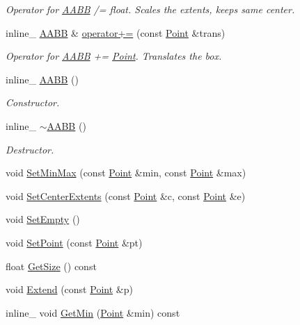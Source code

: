 \begin{DoxyCompactItemize}
\begin{DoxyCompactList}\small\item\em Operator for \hyperlink{class_a_a_b_b}{A\+A\+B\+B} /= float. Scales the extents, keeps same center. \end{DoxyCompactList}\item 
\hypertarget{class_a_a_b_b_a1aa2bcb5279bd03fc4b9e074e1249fec}{inline\+\_\+ \hyperlink{class_a_a_b_b}{A\+A\+B\+B} \& \hyperlink{class_a_a_b_b_a1aa2bcb5279bd03fc4b9e074e1249fec}{operator+=} (const \hyperlink{class_point}{Point} \&trans)}\label{class_a_a_b_b_a1aa2bcb5279bd03fc4b9e074e1249fec}

\begin{DoxyCompactList}\small\item\em Operator for \hyperlink{class_a_a_b_b}{A\+A\+B\+B} += \hyperlink{class_point}{Point}. Translates the box. \end{DoxyCompactList}\item 
\hypertarget{class_a_a_b_b_ad318cad1a1e40ecb7560f953d439527c}{inline\+\_\+ \hyperlink{class_a_a_b_b_ad318cad1a1e40ecb7560f953d439527c}{A\+A\+B\+B} ()}\label{class_a_a_b_b_ad318cad1a1e40ecb7560f953d439527c}

\begin{DoxyCompactList}\small\item\em Constructor. \end{DoxyCompactList}\item 
\hypertarget{class_a_a_b_b_a013e16f21145d12bd19b384b31055fb2}{inline\+\_\+ \hyperlink{class_a_a_b_b_a013e16f21145d12bd19b384b31055fb2}{$\sim$\+A\+A\+B\+B} ()}\label{class_a_a_b_b_a013e16f21145d12bd19b384b31055fb2}

\begin{DoxyCompactList}\small\item\em Destructor. \end{DoxyCompactList}\item 
void \hyperlink{class_a_a_b_b_aefd07f1b846deede5a40294e0128357d}{Set\+Min\+Max} (const \hyperlink{class_point}{Point} \&min, const \hyperlink{class_point}{Point} \&max)
\item 
void \hyperlink{class_a_a_b_b_a926e591a06add61aaf40f4660bd52438}{Set\+Center\+Extents} (const \hyperlink{class_point}{Point} \&c, const \hyperlink{class_point}{Point} \&e)
\item 
void \hyperlink{class_a_a_b_b_acbb23abc7e661b2388c17fca54cc80ed}{Set\+Empty} ()
\item 
void \hyperlink{class_a_a_b_b_a5fa5fe0ce941e8c991775be34337acad}{Set\+Point} (const \hyperlink{class_point}{Point} \&pt)
\item 
float \hyperlink{class_a_a_b_b_ad40b364b3fd436764dd297336a902040}{Get\+Size} () const 
\item 
void \hyperlink{class_a_a_b_b_af1ec90a9de45e8ee2a0f3589404f2981}{Extend} (const \hyperlink{class_point}{Point} \&p)
\item 
\hypertarget{class_a_a_b_b_ac8cb1707616aba70f650bb017476531e}{inline\+\_\+ void \hyperlink{class_a_a_b_b_ac8cb1707616aba70f650bb017476531e}{Get\+Min} (\hyperlink{class_point}{Point} \&min) const }\label{class_a_a_b_b_ac8cb1707616aba70f650bb017476531e}


\end{DoxyCompactItemize}
